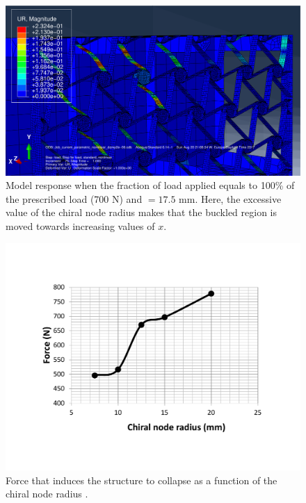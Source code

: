       \begin{figure}[!htpb] %
        \centering
        \includegraphics[width=0.8 \textwidth]{figures/../figures/result-sim/r/17coma5-UR}
        \caption[Model response when the fraction of load applied equals to 100\% of the prescribed load (700 N) and \chir$ = 17.5$ mm]{Model response when the fraction of load applied equals to 100\% of the prescribed load (700 N) and \chir$ = 17.5$ mm. Here, the excessive value of the chiral node radius \chir makes that the buckled region is moved towards increasing values of $x$.}\label{fig:r17coma5-UR}
      \end{figure}

      \begin{figure}[!htpb] %
        \centering
        \includegraphics[width=0.8 \textwidth]{figures/../figures/result-sim/r/force_r}
        \caption[Force that induces the structure to collapse as a function of the chiral node depth]{Force that induces the structure to collapse as a function of the chiral node radius \chir.}\label{fig:force_r}
      \end{figure}

    \clearpage
